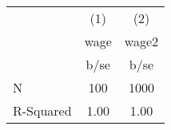 {
\def\sym#1{\ifmmode^{#1}\else\(^{#1}\)\fi}
\begin{tabular}{l*{2}{c}}
\hline\hline
            &\multicolumn{1}{c}{(1)}&\multicolumn{1}{c}{(2)}\\
            &\multicolumn{1}{c}{wage}&\multicolumn{1}{c}{wage2}\\
            &        b/se         &        b/se         \\
\hline
\hline
N           &         100         &        1000         \\
R-Squared   &        1.00         &        1.00         \\
\hline\hline
\end{tabular}
}
